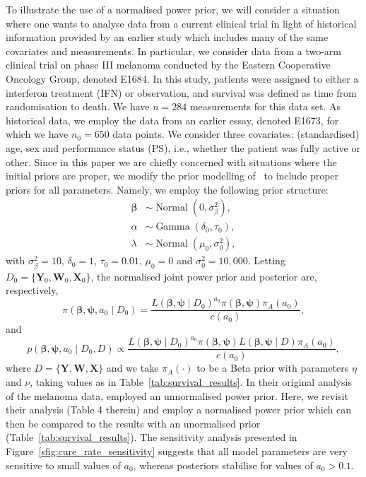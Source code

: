 \documentclass[a4paper, notitlepage, 11pt]{article}
\begin{document}
To illustrate the use of a normalised power prior, we will consider a situation where one wants to analyse data from a current clinical trial in light of historical information provided by an earlier study which includes many of the same covariates and measurements.
In particular, we consider data from a two-arm clinical trial on phase III melanoma conducted by the Eastern Cooperative Oncology Group, denoted E1684.
In this study, patients were assigned to either a interferon treatment (IFN) or observation, and survival was defined as time from randomisation to death.
We have $n = 284$ measurements for this data set.
As historical data, we employ the data from an earlier essay, denoted E1673, for which we have $n_0 = 650$ data points.
We consider three covariates: (standardised) age, sex and performance status (PS), i.e., whether the patient was fully active or other.
Since in this paper we are chiefly concerned with situations where the initial priors are proper, we modify the prior modelling of~\cite{Chen1999a} to include proper priors for all parameters.
Namely, we employ the following prior structure:
\begin{align*}
 \boldsymbol \beta &\sim \operatorname{Normal}(0, \sigma_\beta^2), \\
 \alpha & \sim \operatorname{Gamma}(\delta_0, \tau_0),\\
 \lambda  & \sim \operatorname{Normal}(\mu_0, \sigma_0^2),
\end{align*}
with $\sigma_\beta^2 = 10$, $\delta_0  = 1$, $\tau_0 = 0.01$, $\mu_0 = 0$ and $\sigma_0^2 = 10, 000$.
Letting $D_0 = \{ \boldsymbol Y_0, \boldsymbol W_0, \boldsymbol X_0\}$, the normalised joint power prior and posterior are, respectively,
\begin{equation}
 \label{eq:power_prior_cure_rate}
 \pi(\boldsymbol \beta, \boldsymbol \psi, a_0 \mid D_0) = \frac{L(\boldsymbol\beta, \boldsymbol \psi \mid D_0)^{a_0}\pi(\boldsymbol \beta, \boldsymbol \psi) \pi_A(a_0)}{c(a_0)},
\end{equation}
and
\begin{equation}
 \label{eq:power_posterior_cure_rate}
 p(\boldsymbol \beta, \boldsymbol \psi, a_0 \mid D_0, D) \propto \frac{L(\boldsymbol\beta, \boldsymbol \psi \mid D_0)^{a_0}\pi(\boldsymbol \beta, \boldsymbol \psi) L(\boldsymbol\beta, \boldsymbol \psi \mid D) \pi_A(a_0) }{c(a_0)},
\end{equation}
where $D = \{ \boldsymbol Y, \boldsymbol W, \boldsymbol X\}$ and we take $\pi_A(\cdot)$ to be a Beta prior with parameters $\eta$ and $\nu$, taking values as in Table~\ref{tab:survival_results}.
In their original analysis of the melanoma data, \cite{Chen1999a} employed an unnormalised power prior.
Here, we revisit their analysis (Table 4 therein) and employ a normalised power prior which can then be compared to the results with an unormalised prior (Table~\ref{tab:survival_results}).
The sensitivity analysis presented in Figure~\ref{sfig:cure_rate_sensitivity} suggests that all model parameters are very sensitive to small values of $a_0$, whereas posteriors stabilise for values of $a_0 > 0.1$.
\end{document}
